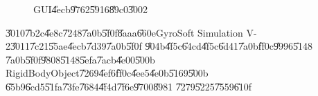 \bigskip

\begin{figure}[th]
\caption{GUI\U{4ecb}\U{9762}\U{5916}\U{89c0}\U{3002}}
\begin{center}
\end{center}
\end{figure}


\bigskip

\U{3010}\U{7b2c}\U{4e8c}\U{7248}\U{7a0b}\U{5f0f}\U{8aaa}\U{660e}GyroSoft
Simulation V-2\U{3011}\U{7c21}\U{55ae}\U{4ecb}\U{7d39}\U{7a0b}\U{5f0f}%
\U{904b}\U{4f5c}\U{64cd}\U{4f5c}\U{6d41}\U{7a0b}\U{ff0c}\U{9996}\U{5148}%
\U{7a0b}\U{5f0f}\U{9808}\U{5148}\U{5efa}\U{7acb}\U{4e00}\U{500b}%
RigidBodyObject\U{7269}\U{4ef6}\U{ff0c}\U{4ee5}\U{4e0b}\U{5169}\U{500b}%
\U{65b9}\U{6cd5}\U{51fa}\U{73fe}\U{7684}\U{4f4d}\U{7f6e}\U{9700}\U{8981}%
\U{7279}\U{5225}\U{7559}\U{610f}

